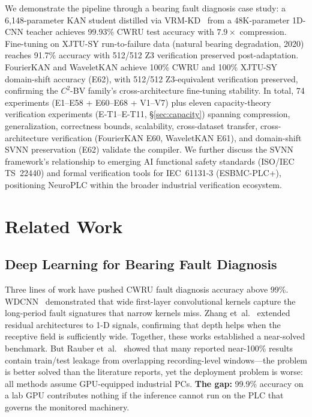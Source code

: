 \documentclass[journal,onecolumn]{IEEEtran}
\newcommand{\neuroplc}{NeuroPLC\xspace}
\begin{document}
\begin{enumerate}
We demonstrate the pipeline through a bearing fault diagnosis case study:
a 6,148-parameter KAN student distilled via VRM-KD~\cite{zhang2025vrm} from
a 48K-parameter 1D-CNN teacher achieves 99.93\% CWRU test accuracy with
$7.9\times$ compression. Fine-tuning on XJTU-SY run-to-failure data
(natural bearing degradation, 2020) reaches 91.7\% accuracy with 512/512
Z3 verification preserved post-adaptation. FourierKAN and WaveletKAN
achieve 100\% CWRU and 100\% XJTU-SY domain-shift accuracy (E62),
with 512/512 Z3-equivalent verification preserved, confirming the
$C^2$-BV family's cross-architecture fine-tuning stability. In total,
74 experiments (E1--E58 + E60--E68
+ V1--V7) plus eleven capacity-theory verification experiments
(E-T1--E-T11, {\S}\ref{sec:capacity}) spanning compression,
generalization, correctness bounds,
scalability, cross-dataset transfer, cross-architecture verification
(FourierKAN E60, WaveletKAN E61), and domain-shift SVNN preservation
(E62) validate the compiler. We further discuss the
SVNN framework's relationship to emerging AI functional safety standards
(ISO/IEC TS~22440) and formal verification tools for IEC~61131-3
(ESBMC-PLC+), positioning \neuroplc within the broader industrial
verification ecosystem.
\end{enumerate}

\section{Related Work}
\label{sec:related}

\subsection{Deep Learning for Bearing Fault Diagnosis}

Three lines of work have pushed CWRU fault diagnosis accuracy above 99\%.
WDCNN~\cite{zhang2017wdcnn} demonstrated that wide first-layer convolutional
kernels capture the long-period fault signatures that narrow kernels miss.
Zhang et~al.~\cite{zhang2020resnet1d} extended residual architectures to
1-D signals, confirming that depth helps when the receptive field is
sufficiently wide. Together, these works established a near-solved benchmark.
But Rauber et~al.~\cite{rauber2020experimental} showed that many reported
near-100\% results contain train/test leakage from overlapping recording-level
windows---the problem is better solved than the literature reports, yet the
deployment problem is worse: all methods assume GPU-equipped industrial PCs.
\textbf{The gap:} 99.9\% accuracy on a lab GPU contributes nothing if the
inference cannot run on the PLC that governs the monitored machinery.
\end{document}

